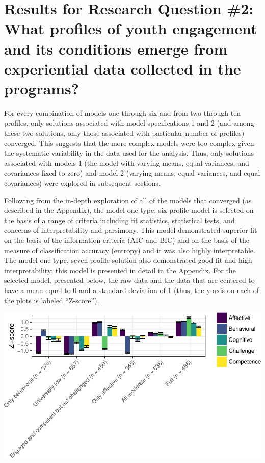 \documentclass[]{msu-thesis}
\theoremstyle{definition}
\theoremstyle{definition}
\theoremstyle{definition}
\theoremstyle{remark}
\begin{document}
\section{Results for Research Question \#2: What profiles of youth
engagement and its conditions emerge from experiential data collected in
the
programs?}\label{results-for-research-question-2-what-profiles-of-youth-engagement-and-its-conditions-emerge-from-experiential-data-collected-in-the-programs}

For every combination of models one through six and from two through ten
profiles, only solutions associated with model specifications 1 and 2
(and among these two solutions, only those associated with particular
number of profiles) converged. This suggests that the more complex
models were too complex given the systematic variability in the data
used for the analysis. Thus, only solutions associated with models 1
(the model with varying means, equal variances, and covariances fixed to
zero) and model 2 (varying means, equal variances, and equal
covariances) were explored in subsequent sections.

Following from the in-depth exploration of all of the models that
converged (as described in the Appendix), the model one type, six
profile model is selected on the basis of a range of criteria including
fit statistics, statistical tests, and concerns of interpretability and
parsimony. This model demonstrated superior fit on the basis of the
information criteria (AIC and BIC) and on the basis of the measure of
classification accuracy (entropy) and it was also highly interpretable.
The model one type, seven profile solution also demonstrated good fit
and high interpretability; this model is presented in detail in the
Appendix. For the selected model, presented below, the raw data and the
data that are centered to have a mean equal to 0 and a standard
deviation of 1 (thus, the y-axis on each of the plots is labeled
``Z-score'').

\begin{center}\includegraphics[width=0.8\linewidth]{rosenberg-dissertation_files/figure-latex/unnamed-chunk-10-1} \end{center}
\end{document}
